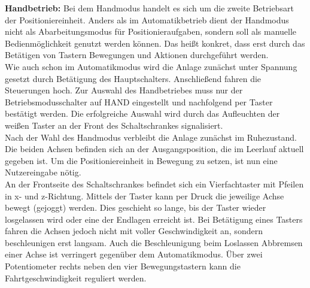 \documentclass[../../../Bachelorarbeit.tex]{subfiles}
\begin{document}
\smallskip
\newline
\textbf{Handbetrieb:} Bei dem Handmodus handelt es sich um die zweite Betriebsart der Positioniereinheit. Anders als im Automatikbetrieb dient der Handmodus nicht als Abarbeitungsmodus für Positionieraufgaben, sondern soll als manuelle Bedienmöglichkeit genutzt werden können. Das heißt konkret, dass erst durch das Betätigen von Tastern Bewegungen und Aktionen durchgeführt werden.\\
Wie auch schon im Automatikmodus wird die Anlage zunächst unter Spannung gesetzt durch Betätigung des Hauptschalters. Anschließend fahren die Steuerungen hoch. Zur Auswahl des Handbetriebes muss nur der Betriebsmodusschalter auf \glqq HAND\grqq{} eingestellt und nachfolgend per Taster bestätigt werden. Die erfolgreiche Auswahl wird durch das Aufleuchten der weißen Taster an der Front des Schaltschrankes signalisiert.\\
Nach der Wahl des Handmodus verbleibt die Anlage zunächst im Ruhezustand. Die beiden Achsen befinden sich an der Ausgangsposition, die im Leerlauf aktuell gegeben ist. Um die Positioniereinheit in Bewegung zu setzen, ist nun eine Nutzereingabe nötig.\\
An der Frontseite des Schaltschrankes befindet sich ein Vierfachtaster mit Pfeilen in x- und z-Richtung. Mittels der Taster kann per Druck die jeweilige Achse bewegt (gejoggt) werden. Dies geschieht so lange, bis der Taster wieder losgelassen wird oder eine der Endlagen erreicht ist. Bei Betätigung eines Tasters fahren die Achsen jedoch nicht mit voller Geschwindigkeit an, sondern beschleunigen erst langsam. Auch die Beschleunigung beim Loslassen \bzw Abbremsen einer Achse ist verringert gegenüber dem Automatikmodus. Über zwei Potentiometer rechts neben den vier Bewegungstastern kann die Fahrtgeschwindigkeit reguliert werden.\\
\end{document}
